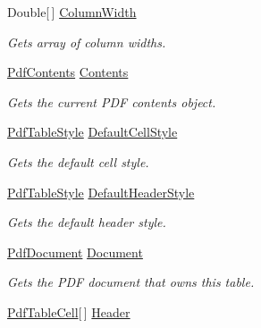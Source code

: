 \begin{DoxyCompactItemize}
Double\mbox{[}$\,$\mbox{]} \hyperlink{class_pdf_file_writer_1_1_pdf_table_a7c925f9f99dcd41a93adfa92a4d312c5}{Column\+Width}
\begin{DoxyCompactList}\small\item\em Gets array of column widths. \end{DoxyCompactList}\item 
\hyperlink{class_pdf_file_writer_1_1_pdf_contents}{Pdf\+Contents} \hyperlink{class_pdf_file_writer_1_1_pdf_table_ae2afb49f8b53a3d28cc2ddbe086574d5}{Contents}
\begin{DoxyCompactList}\small\item\em Gets the current P\+DF contents object. \end{DoxyCompactList}\item 
\hyperlink{class_pdf_file_writer_1_1_pdf_table_style}{Pdf\+Table\+Style} \hyperlink{class_pdf_file_writer_1_1_pdf_table_a79b592d8a634fbb2d47c7ceb9b63f77f}{Default\+Cell\+Style}
\begin{DoxyCompactList}\small\item\em Gets the default cell style. \end{DoxyCompactList}\item 
\hyperlink{class_pdf_file_writer_1_1_pdf_table_style}{Pdf\+Table\+Style} \hyperlink{class_pdf_file_writer_1_1_pdf_table_ac13226d28d2842c99eb5674724edc48b}{Default\+Header\+Style}
\begin{DoxyCompactList}\small\item\em Gets the default header style. \end{DoxyCompactList}\item 
\hyperlink{class_pdf_file_writer_1_1_pdf_document}{Pdf\+Document} \hyperlink{class_pdf_file_writer_1_1_pdf_table_a69e0b368de484686e90d1902295ca265}{Document}
\begin{DoxyCompactList}\small\item\em Gets the P\+DF document that owns this table. \end{DoxyCompactList}\item 
\hyperlink{class_pdf_file_writer_1_1_pdf_table_cell}{Pdf\+Table\+Cell}\mbox{[}$\,$\mbox{]} \hyperlink{class_pdf_file_writer_1_1_pdf_table_a347bc6a7b63b21c8c08b1b6c1523079f}{Header}

\end{DoxyCompactItemize}
